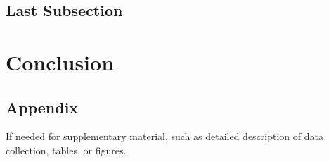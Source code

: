 \documentclass{xai-thesis}
\begin{document}
\subsection{Last Subsection}
\label{subsec:last}

\section{Conclusion}



\clearpage
\begin{appendix}
	\section{Appendix}
	If needed for supplementary material, such as detailed description of data collection, tables, or figures.
	
\end{appendix}

\clearpage
\renewcommand\refname{Bibliography}



\clearpage
\makeThesisDeclaration
\end{document}
